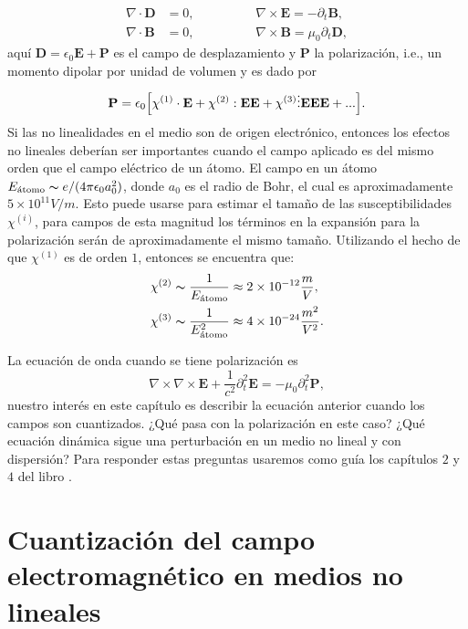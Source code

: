 \begin{align}\label{ec:Maxwells}
\nabla \cdot \textbf{D}&=0, \hspace{2cm} \nabla \times\textbf{E}=-\partial_t\textbf{B},\\
\nabla\cdot\textbf{B}&=0, \hspace{2cm} \nabla \times \textbf{B}=\mu_0\partial_t \textbf{D},
\end{align}
aqu\'{i} $\textbf{D}=\epsilon_0\textbf{E}+\textbf{P}$ es el campo de desplazamiento y $\textbf{P}$ la polarizaci\'{o}n, i.e., un momento dipolar por unidad de volumen y es dado por 
\begin{equation}\label{ec:polarizacion}
\textbf{P}=\epsilon_0\Bigl[\chi^{(1)}\cdot\textbf{E}+\chi^{(2)}:\textbf{EE}+\chi^{(3)}\vdots\textbf{EEE}+...\Bigr].
\end{equation}
Si las no linealidades en el medio son de origen electrónico, entonces los efectos no lineales deberían ser importantes cuando el campo aplicado es del mismo orden que el campo eléctrico de un átomo. El campo en un átomo $E_{\text{\'{a}tomo}}\thicksim e/(4\pi\epsilon_0 a_0^2)$, donde $a_0$ es el radio de Bohr, el cual es aproximadamente  $5\times10^{11}V/m$. Esto puede usarse para estimar el tama\~{n}o de las susceptibilidades  $\chi^{(i)}$, para campos de esta magnitud los términos en la expansión para la polarización serán de aproximadamente el mismo tamaño. Utilizando el hecho de que $\chi^{(1)}$ es de orden $1$, entonces se encuentra que:
\begin{align}
\chi^{(2)}&\thicksim \frac{1}{E_{\text{\'{a}tomo}}}\approx 2\times10^{-12}\frac{m}{V},\\
\chi^{(3)}&\thicksim \frac{1}{E_{\text{\'{a}tomo}}^2}\approx 4\times10^{-24}\frac{m^2}{V^2}.
\end{align}

La ecuaci\'{o}n de onda cuando se tiene polarizaci\'{o}n es
\begin{equation}
\nabla \times \nabla \times \textbf{E}+\frac{1}{c^2}\partial_t^2\textbf{E}=-\mu_0\partial_t^2\textbf{P},
\end{equation}
nuestro inter\'{e}s en este cap\'{i}tulo es  describir la ecuaci\'{o}n anterior cuando los campos son cuantizados. ¿Qu\'{e} pasa con la polarizaci\'{o}n en este caso? ¿Qu\'{e} ecuaci\'{o}n din\'{a}mica sigue una perturbaci\'{o}n en un medio no lineal y con dispersi\'{o}n? Para responder estas preguntas usaremos como gu\'{i}a los cap\'{i}tulos $2$ y $4$ del libro \cite{squeezing2004pd}.
\section{Cuantizaci\'{o}n del campo electromagn\'{e}tico en medios no lineales}

